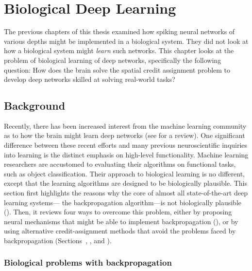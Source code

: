 \chapter{Biological Deep Learning}

The previous chapters of this thesis examined how spiking neural networks
of various depths might be implemented in a biological system.
They did not look at how a biological system might
\emph{learn} such networks.
This chapter looks at the problem of biological learning of deep networks,
specifically the following question:
How does the brain solve the spatial credit assignment problem
to develop deep networks skilled at solving real-world tasks?


\section{Background}

Recently, there has been increased interest from the machine learning community
as to how the brain might learn deep networks
(see \textcite{Marblestone2016} for a review).
One significant difference between these recent efforts
and many previous neuroscientific inquiries into learning
is the distinct emphasis on high-level functionality.
Machine learning researchers are accustomed to
evaluating their algorithms on functional tasks, such as object classification.
Their approach to biological learning is no different,
except that the learning algorithms are designed
to be biologically plausible.
This section first highlights the reasons why
the core of almost all state-of-the-art deep learning systems---%
the backpropagation algorithm---is not biologically plausible ().
Then, it reviews four ways to overcome this problem,
either by proposing neural mechanisms
that might be able to implement backpropagation (),
or by using alternative credit-assignment methods
that avoid the problems faced by backpropagation
(Sections~, , and ).


\subsection{Biological problems with backpropagation}

